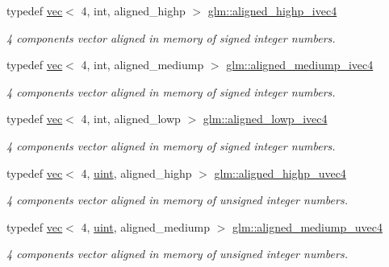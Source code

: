 \begin{DoxyCompactItemize}
typedef \mbox{\hyperlink{structglm_1_1vec}{vec}}$<$ 4, int, aligned\+\_\+highp $>$ \mbox{\hyperlink{group__gtc__type__aligned_gabbac4883efc1760f4efb450753794f2d}{glm\+::aligned\+\_\+highp\+\_\+ivec4}}
\begin{DoxyCompactList}\small\item\em 4 components vector aligned in memory of signed integer numbers. \end{DoxyCompactList}\item 
typedef \mbox{\hyperlink{structglm_1_1vec}{vec}}$<$ 4, int, aligned\+\_\+mediump $>$ \mbox{\hyperlink{group__gtc__type__aligned_ga6960abdd6dda1c21b99d28894414ff67}{glm\+::aligned\+\_\+mediump\+\_\+ivec4}}
\begin{DoxyCompactList}\small\item\em 4 components vector aligned in memory of signed integer numbers. \end{DoxyCompactList}\item 
typedef \mbox{\hyperlink{structglm_1_1vec}{vec}}$<$ 4, int, aligned\+\_\+lowp $>$ \mbox{\hyperlink{group__gtc__type__aligned_ga45a747351d314655f410cbdb942eea41}{glm\+::aligned\+\_\+lowp\+\_\+ivec4}}
\begin{DoxyCompactList}\small\item\em 4 components vector aligned in memory of signed integer numbers. \end{DoxyCompactList}\item 
typedef \mbox{\hyperlink{structglm_1_1vec}{vec}}$<$ 4, \mbox{\hyperlink{group__core__precision_ga4fd29415871152bfb5abd588334147c8}{uint}}, aligned\+\_\+highp $>$ \mbox{\hyperlink{group__gtc__type__aligned_ga85553b476297f73c07bf3228ffb02d81}{glm\+::aligned\+\_\+highp\+\_\+uvec4}}
\begin{DoxyCompactList}\small\item\em 4 components vector aligned in memory of unsigned integer numbers. \end{DoxyCompactList}\item 
typedef \mbox{\hyperlink{structglm_1_1vec}{vec}}$<$ 4, \mbox{\hyperlink{group__core__precision_ga4fd29415871152bfb5abd588334147c8}{uint}}, aligned\+\_\+mediump $>$ \mbox{\hyperlink{group__gtc__type__aligned_gace9017071502bcfcd099532706881836}{glm\+::aligned\+\_\+mediump\+\_\+uvec4}}
\begin{DoxyCompactList}\small\item\em 4 components vector aligned in memory of unsigned integer numbers. \end{DoxyCompactList}\item 

\end{DoxyCompactItemize}
